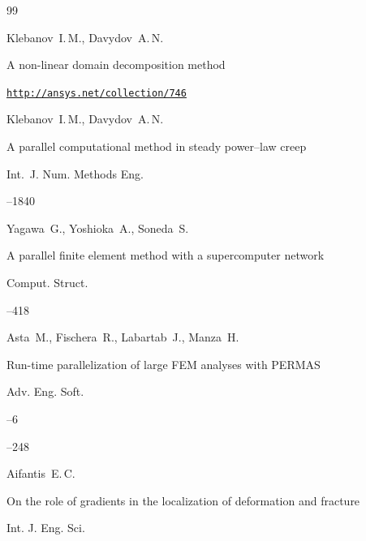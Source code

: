 \begin{thebibliography}{99}




\by Klebanov~I.\,M., Davydov~A.\,N.

\eprint A non-linear domain decomposition method

\eprintinfo \href{http://ansys.net/collection/746}{\tt http://ansys.net/collection/746}




\by Klebanov~I.\,M., Davydov~A.\,N.

\paper A parallel computational method in steady power--law creep

\jour Int.~J. Num. Methods Eng.




--1840




\by Yagawa~G., Yoshioka~A., Soneda~S.

\paper A parallel finite element method with a supercomputer network

\jour Comput. Struct. 




--418




\by Asta~M., Fischera~R.,  Labartab~J., Manza~H.

\paper Run-time parallelization of large FEM analyses with PERMAS

\jour Adv. Eng. Soft.



--6

--248




\by Aifantis~E.\,C.

\paper On the role of gradients in the localization of deformation and fracture 

\jour Int. J. Eng. Sci.



\end{thebibliography}
